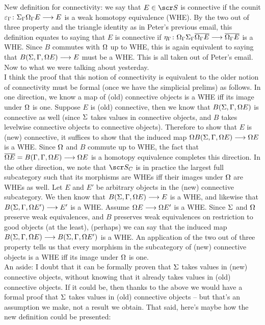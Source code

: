 \documentclass{amsart}
\theoremstyle{definition}
\begin{document}
New definition for connectivity: we say that $E \in \sS$ is connective if the counit $\varepsilon_{\Gamma} \colon \Sigma_{\Gamma} \Omega_{\Gamma} E \longrightarrow E$ is a weak homotopy equivalence (WHE). By the two out of three property and the triangle identity as in Peter’s previous email, this definition equates to saying that $E$ is connective if $\eta_{\Gamma} \colon \Omega_{\Gamma}\Sigma_{\Gamma} \overline{\Omega_{\Gamma} E} \longrightarrow \overline{\Omega_{\Gamma} E}$ is a WHE. Since $B$ commutes with $\Omega$ up to WHE, this is again equivalent to saying that $B(\Sigma, \Gamma, \Omega E) \longrightarrow E$ must be a WHE. This is all taken out of Peter's email. Now to what we were talking about yesterday.\\

I think the proof that this notion of connectivity is equivalent to the older notion of connectivity must be formal (once we have the simplicial prelims) as follows. In one direction, we know a map of (old) connective objects is a WHE iff its image under $\Omega$ is one. Suppose $E$ is (old) connective, then we know that $B(\Sigma, \Gamma, \Omega E)$ is connective as well (since $\Sigma$ takes values in connective objects, and $B$ takes levelwise connective objects to connective objects). Therefore to show that $E$ is (new) connective, it suffices to show that the induced map $\Omega B(\Sigma,\Gamma,\Omega E) \longrightarrow \Omega E$ is a WHE. Since $\Omega$ and $B$ commute up to WHE, the fact that $\overline{\Omega E} = B(\Gamma, \Gamma, \Omega E) \longrightarrow \Omega E$ is a homotopy equivalence completes this direction. In the other direction, we note that $\sS_C$ is in practice the largest full subcategory such that its morphisms are WHEs iff their images under $\Omega$ are WHEs as well. Let $E$ and $E'$ be arbitrary objects in the (new) connective subcategory. We then know that $B(\Sigma,\Gamma,\Omega E) \longrightarrow E$ is a WHE, and likewise that $B(\Sigma, \Gamma, \Omega E') \longrightarrow E'$ is a WHE. Assume $\Omega E \longrightarrow \Omega E'$ is a WHE. Since $\Sigma$ and $\Omega$ preserve weak equivalences, and $B$ preserves weak equivalences on restriction to good objects (at the least), (perhaps) we can say that the induced map $B(\Sigma,\Gamma,\Omega E) \longrightarrow B(\Sigma,\Gamma,\Omega E')$ is a WHE. An application of the two out of three property tells us that every morphism in the subcategory of (new) connective objects is a WHE iff its image under $\Omega$ is one. \\

An aside: I doubt that it can be formally proven that $\Sigma$ takes values in (new) connective objects, without knowing that it already takes values in (old) connective objects. If it could be, then thanks to the above we would have a formal proof that $\Sigma$ takes values in (old) connective objects -- but that's an assumption we make, not a result we obtain. That said, here's maybe how the new definition could be presented:
\end{document}
